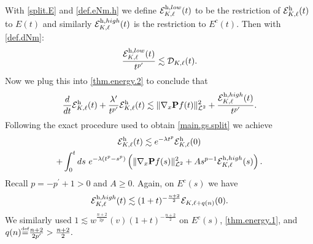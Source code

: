 \documentclass{amsart}
\numberwithin{equation}{section}
\begin{document}
With \eqref{split.E} and \eqref{def.eNm.h} we define ${\mathcal{E}}_{{K},{\ell}}^{{\rm h},low}(t)$ to be the restriction of 
${\mathcal{E}}_{{K},{\ell}}^{\rm h}(t)$ to $E(t)$ and similarly ${\mathcal{E}}_{{K},{\ell}}^{{\rm h},high}(t)$ is the restriction to $E^c(t)$.  Then with \eqref{def.dNm}:
\begin{equation}
\label{soft.up.h}
\frac{{\mathcal{E}}_{{K},{\ell}}^{{\rm h},low}(t)}{ t^{p^\prime} }\lesssim   {\mathcal{D}}_{{K},{\ell}}(t).
\end{equation}
Now we plug this into \eqref{thm.energy.2}  to conclude that 
\begin{equation}
\notag
    \frac{d}{dt} {\mathcal{E}}_{{K},{\ell}}^{\rm h}(t)+ \frac{{\lambda}^\prime}{ t^{p^\prime} }  {\mathcal{E}}_{{K},{\ell}}^{{\rm h}}(t)
    \lesssim
    \|{\nabla}_x{\mathbf{P}} {f}(t)\|_{{\mathcal{L}}^2}^2
    +
     \frac{{\mathcal{E}}_{{K},{\ell}}^{{\rm h},high}(t)}{ t^{p^\prime} }.
\end{equation}
Following the exact procedure used to obtain \eqref{main.gs.split} we achieve
\begin{multline}
{\mathcal{E}}_{{K},{\ell}}^{\rm h}(t)
\lesssim
e^{-\lambda t^{p}}{\mathcal{E}}_{{K},{\ell}}^{\rm h}(0) 
\\
+   
\int_0^t 
ds ~ e^{-\lambda (t^{p}-s^p)}
\left( 
\|{\nabla}_x{\mathbf{P}} {f}(s)\|_{{\mathcal{L}}^2}^2
+
{A}
s^{p-1} 
 {\mathcal{E}}_{{K},{\ell}}^{{\rm h},high}(s)
\right).
\label{main.h.split}
\end{multline}
Recall $p = -p^\prime +1>0$ and ${A} \ge 0$.
Again, on $E^c(s)$  we have
\begin{equation}
\label{decay.high.h}
{\mathcal{E}}_{{K},{\ell}}^{{\rm h},high}(t)
\lesssim
(1+t)^{-\frac{{n}+2}{2}} {\mathcal{E}}_{{K},{\ell}+{q({n})}}(0).
\end{equation}
We similarly used 
$
1  \lesssim w^{\frac{{n}+2}{2p^\prime}}(v) (1+t)^{-\frac{{n}+2}{2}}
$
on $E^c(s)$, \eqref{thm.energy.1}, and
$
{q({n})} {\overset{\mbox{\tiny{def}}}{=}} \frac{{n}+2}{2p^\prime} > \frac{{n}+2}{2}.
$
\end{document}
